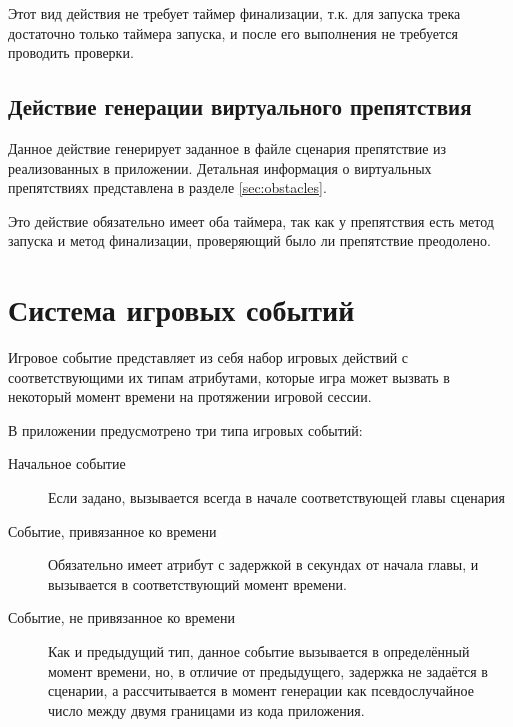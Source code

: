 Этот вид действия не требует таймер финализации, т.к. для запуска трека достаточно только таймера запуска, и после его выполнения не требуется проводить проверки.

\subsection*{Действие генерации виртуального препятствия}
Данное действие генерирует заданное в файле сценария препятствие из реализованных в приложении. Детальная информация о виртуальных препятствиях представлена в разделе \ref{sec:obstacles}.

Это действие обязательно имеет оба таймера, так как у препятствия есть метод запуска и метод финализации, проверяющий было ли препятствие преодолено.
 
\section{Система игровых событий}
\label{sec:events}
Игровое событие представляет из себя набор игровых действий с соответствующими их типам атрибутами, которые игра может вызвать в некоторый момент времени на протяжении игровой сессии.

В приложении предусмотрено три типа игровых событий:
\begin{description}
	\item [Начальное событие] Если задано, вызывается всегда в начале соответствующей главы сценария
	\item [Событие, привязанное ко времени] Обязательно имеет атрибут с задержкой в секундах от начала главы, и вызывается в соответствующий момент времени.
	\item [Событие, не привязанное ко времени] Как и предыдущий тип, данное событие вызывается в определённый момент времени, но, в отличие от предыдущего, задержка не задаётся в сценарии, а рассчитывается в момент генерации как псевдослучайное число между двумя границами из кода приложения.
\end{description}



